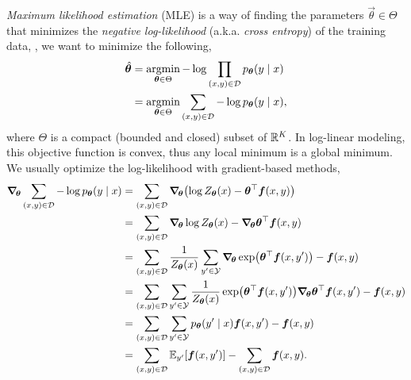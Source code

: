 \textit{Maximum likelihood estimation} (MLE) is a way of finding the parameters
$\vec{\theta}\in\Theta$ that minimizes the \textit{negative log-likelihood}
(a.k.a. \textit{cross entropy}) of the training data, \ie, we want to minimize
the following,
\begin{align*}
    \hat{\bm{\theta}} & = \operatorname*{argmin}_{\bm{\theta}\in\Theta} -\log \prod_{(x,y)\in\mathcal{D}} p_{\bm{\theta}}(y \mid x) \\
                       & = \operatorname*{argmin}_{\bm{\theta}\in\Theta} \sum_{(x,y)\in\mathcal{D}} -\log p_{\bm{\theta}}(y\mid x),
\end{align*}
where $\Theta$ is a compact (bounded and closed) subset of $\mathbb{R}^K$. In log-linear modeling, this objective function is convex, thus
any local minimum is a global minimum. We usually optimize the log-likelihood
with gradient-based methods,
\begin{align*}
    \grad{\sum_{(x,y)\in\mathcal{D}} - \log p_{\vec{\theta}}(y \mid x)}{\vec{\theta}} & = \sum_{(x,y)\in\mathcal{D}} \grad{\lft( \log Z_{\vec{\theta}}(x) - \transpose{\vec{\theta}} \vec{f}(x,y) \rgt)}{\vec{\theta}}                                                                                        \\
                                                                                      & = \sum_{(x,y)\in\mathcal{D}} \grad{\log Z_{\vec{\theta}}(x)}{\vec{\theta}} - \grad{\transpose{\vec{\theta}} \vec{f}(x,y)}{\vec{\theta}}                                                                               \\
                                                                                      & = \sum_{(x,y)\in\mathcal{D}} \frac{1}{Z_{\vec{\theta}}(x)} \sum_{y'\in\mathcal{Y}} \grad{\exp \lft( \transpose{\vec{\theta}} \vec{f}(x,y') \rgt)}{\vec{\theta}} - \vec{f}(x,y)                                        \\
                                                                                      & = \sum_{(x,y)\in\mathcal{D}} \sum_{y'\in\mathcal{Y}} \frac{1}{Z_{\vec{\theta}}(x)} \exp \lft( \transpose{\vec{\theta}} \vec{f}(x,y') \rgt) \grad{\transpose{\vec{\theta}} \vec{f}(x,y')}{\vec{\theta}} - \vec{f}(x,y) \\
                                                                                      & = \sum_{(x,y)\in\mathcal{D}} \sum_{y'\in\mathcal{Y}} p_{\vec{\theta}}(y'\mid x) \vec{f}(x,y') - \vec{f}(x,y)                                                                                                          \\
                                                                                      & = \sum_{(x,y)\in\mathcal{D}} \E_{y'} [\vec{f}(x,y')] - \sum_{(x,y)\in\mathcal{D}} \vec{f}(x,y).
\end{align*}

